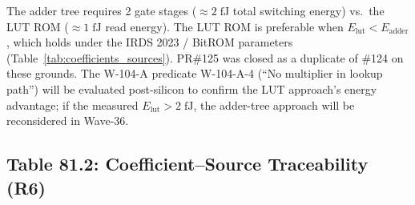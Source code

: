 The adder tree requires 2 gate stages ($\approx 2\;\text{fJ}$ total switching energy)
vs.\ the LUT ROM ($\approx 1\;\text{fJ}$ read energy).  The LUT ROM is preferable
when $E_{\mathrm{lut}} < E_{\mathrm{adder}}$, which holds under the IRDS 2023 /
BitROM parameters (Table~\ref{tab:coefficients_sources}).  PR\#125 was closed
as a duplicate of \#124 on these grounds.  The W-104-A predicate W-104-A-4
(``No multiplier in lookup path'') will be evaluated post-silicon to confirm the
LUT approach's energy advantage; if the measured $E_{\mathrm{lut}} > 2\;\text{fJ}$,
the adder-tree approach will be reconsidered in Wave-36.

\subsection{Table 81.2: Coefficient--Source Traceability (R6)}

